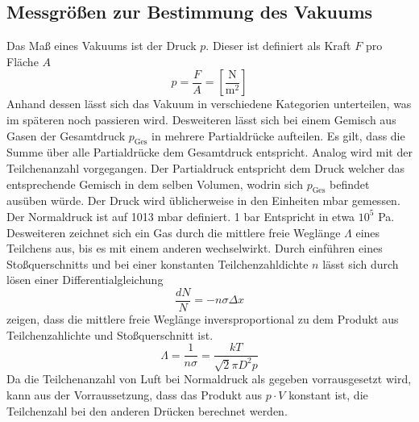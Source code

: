 \subsection{Messgrößen zur Bestimmung des Vakuums}
Das Maß eines Vakuums ist der Druck $p$. Dieser ist definiert als Kraft $F$ pro Fläche $A$
\begin{equation}
  p = \frac{F}{A} = \left[ \frac{\text{N}}{\text{m}^2} \right]
  \label{eqn:druck}
\end{equation}
Anhand dessen lässt sich das Vakuum in verschiedene Kategorien unterteilen, was im späteren noch passieren wird. Desweiteren lässt sich bei einem Gemisch aus Gasen der Gesamtdruck $p_\text{Ges}$ in mehrere Partialdrücke aufteilen. Es gilt, dass die Summe über alle Partialdrücke dem Gesamtdruck entspricht. Analog wird mit der Teilchenanzahl vorgegangen. Der Partialdruck entspricht dem Druck welcher das entsprechende Gemisch in dem selben Volumen, wodrin sich $p_\text{Ges}$ befindet ausüben würde. \newline
Der Druck wird üblicherweise in den Einheiten mbar gemessen. Der Normaldruck ist auf 1013 mbar definiert. 1 bar Entspricht in etwa $10^{5}$ Pa. \newline
Desweiteren zeichnet sich ein Gas durch die mittlere freie Weglänge $\Lambda$ eines Teilchens aus, bis es mit einem anderen wechselwirkt. Durch einführen eines Stoßquerschnitts und bei einer konstanten Teilchenzahldichte $n$ lässt sich durch lösen einer Differentialgleichung
\begin{equation}
  \frac{dN}{N} = -n \sigma \Delta x
  \label{eqn:mfWDGL}
\end{equation}
zeigen, dass die mittlere freie Weglänge  inversproportional zu dem Produkt aus Teilchenzahlichte und Stoßquerschnitt ist.
\begin{equation}
  \Lambda = \frac{1}{n \sigma}= \frac{k T}{\sqrt{2} \pi D^2 p}
  \label{eqn:mfW}
\end{equation}
Da die Teilchenanzahl von Luft bei Normaldruck als gegeben vorrausgesetzt wird, kann aus der Vorraussetzung, dass das Produkt aus $p\cdot V$ konstant ist, die Teilchenzahl bei den anderen Drücken berechnet werden.
